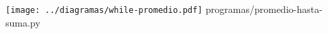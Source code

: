 \documentclass[12pt]{beamer}
\begin{document}
  \begin{frame}
    \begin{columns}
        \texttt{[image: ../diagramas/while-promedio.pdf]}
          {programas/promedio-hasta-suma.py}
    \end{columns}
  \end{frame}
\end{document}
